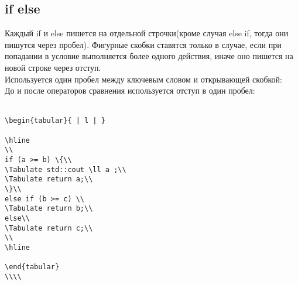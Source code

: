\documentclass{article}
\begin{document}
\newpage


\subsection{if else}
Каждый if и else пишется на отдельной строчки(кроме случая else if, тогда они пишутся через пробел). Фигурные скобки ставятся только в случае, если при попадании в условие выполняется более одного действия, иначе оно пишется на новой строке через отступ.\\
Используется один пробел между ключевым словом и открывающей скобкой:\\
До и после операторов сравнения используется отступ в один пробел:\\\\
\begin{lstlisting}
\begin{tabular}{ | l | }

\hline
\\
if (a >= b) \{\\
\Tabulate std::cout \ll a ;\\
\Tabulate return a;\\
\}\\
else if (b >= c) \\
\Tabulate return b;\\
else\\
\Tabulate return c;\\
\\
\hline

\end{tabular}
\\\\
\end{lstlisting}
\end{document}
